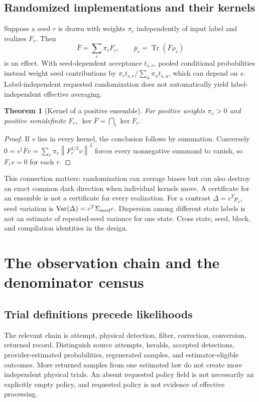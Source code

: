 \documentclass[11pt,a4paper]{article}
\newtheorem{theorem}{Theorem}[section]\newtheorem{lemma}[theorem]{Lemma}\newtheorem{corollary}[theorem]{Corollary}\newtheorem{definition}[theorem]{Definition}\newtheorem{proposition}[theorem]{Proposition}
\newcommand{\tr}{\operatorname{Tr}}\newcommand{\TV}{\operatorname{TV}}\newcommand{\kerop}{\operatorname{ker}}\newcommand{\rank}{\operatorname{rank}}\newcommand{\diag}{\operatorname{diag}}\newcommand{\ran}{\operatorname{ran}}\newcommand{\norm}[1]{\left\lVert#1\right\rVert}\newcommand{\ket}[1]{\lvert#1\rangle}\newcommand{\bra}[1]{\langle#1\rvert}
\begin{document}
\subsection{Randomized implementations and their kernels}
Suppose a seed $r$ is drawn with weights $\pi_r$ independently of input label and realizes $F_r$. Then
\begin{equation}
\bar F=\sum_r\pi_rF_r,\qquad \bar p_s=\tr(\bar F\rho_s)
\end{equation}
is an effect. With seed-dependent acceptance $t_{s,r}$, pooled conditional probabilities instead weight seed contributions by $\pi_rt_{s,r}/\sum_u\pi_ut_{s,u}$, which can depend on $s$. Label-independent requested randomization does not automatically yield label-independent effective averaging.

\begin{theorem}[Kernel of a positive ensemble]
For positive weights $\pi_r>0$ and positive semidefinite $F_r$,
$\kerop\bar F=\bigcap_r\kerop F_r$.
\end{theorem}
\begin{proof}
If $v$ lies in every kernel, the conclusion follows by summation. Conversely $0=v^\dagger\bar Fv=\sum_r\pi_r\norm{F_r^{1/2}v}^2$ forces every nonnegative summand to vanish, so $F_rv=0$ for each $r$.
\end{proof}
This connection matters: randomization can average biases but can also destroy an exact common dark direction when individual kernels move. A certificate for an ensemble is not a certificate for every realization. For a contrast $\Delta=c^Tp_r$, seed variation is $\operatorname{Var}(\Delta)=c^T\Sigma_{\rm seed}c$. Dispersion among different state labels is not an estimate of repeated-seed variance for one state. Cross state, seed, block, and compilation identities in the design.

\section{The observation chain and the denominator census}
\subsection{Trial definitions precede likelihoods}
The relevant chain is attempt, physical detection, filter, correction, conversion, returned record. Distinguish source attempts, heralds, accepted detections, provider-estimated probabilities, regenerated samples, and estimator-eligible outcomes. More returned samples from one estimated law do not create more independent physical trials. An absent requested policy field is not necessarily an explicitly empty policy, and requested policy is not evidence of effective processing.
\end{document}
